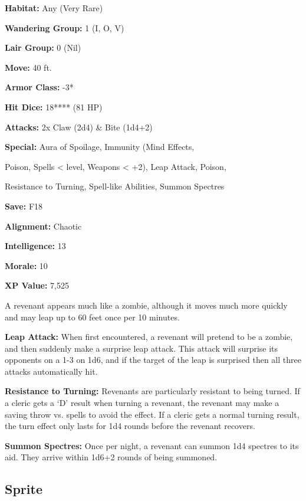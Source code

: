 \begin{multicols*}{2}
{\textbf{Habitat:} Any (Very Rare)

\textbf{Wandering Group:} 1 (I, O, V)

\textbf{Lair Group:} 0 (Nil)

\textbf{Move:} 40 ft.

\textbf{Armor Class:} -3*

\textbf{Hit Dice:} 18**** (81 HP)

\textbf{Attacks:} 2x Claw (2d4) \& Bite (1d4+2)

\textbf{Special:} Aura of Spoilage, Immunity (Mind Effects, 

Poison, Spells <  level, Weapons < +2), Leap Attack, Poison, 

Resistance to Turning, Spell-like Abilities, Summon Spectres

\textbf{Save:} F18

\textbf{Alignment:} Chaotic

\textbf{Intelligence:} 13

\textbf{Morale:} 10

\textbf{XP Value:} 7,525}

A revenant appears much like a zombie, although it moves much more quickly and may leap up to 60 feet once per 10 minutes.

\textbf{Leap Attack:} When first encountered, a revenant will pretend to be a zombie, and then suddenly make a surprise leap attack. This attack will surprise its opponents on a 1-3 on 1d6, and if the target of the leap is surprised then all three attacks automatically hit.

\textbf{Resistance to Turning:} Revenants are particularly resistant to being turned. If a cleric gets a ‘D’ result when turning a revenant, the revenant may make a saving throw vs. spells to avoid the effect. If a cleric gets a normal turning result, the turn effect only lasts for 1d4 rounds before the revenant recovers.

\textbf{Summon Spectres:} Once per night, a revenant can summon 1d4 spectres to its aid. They arrive within 1d6+2 rounds of being summoned.

\subsection{Sprite}
\end{multicols*}
